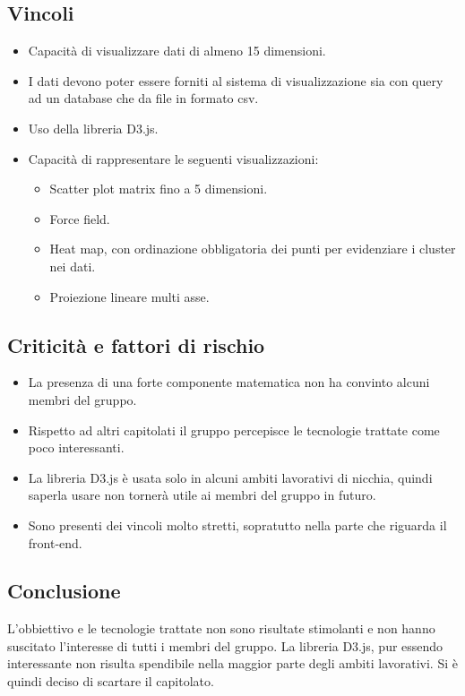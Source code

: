 \subsection{Vincoli}
\begin{itemize}
\item Capacità di visualizzare dati di almeno 15 dimensioni.
\item I dati devono poter essere forniti al sistema di visualizzazione sia con query ad un database che da file in formato csv.
\item Uso della libreria D3.js.
\item Capacità di rappresentare le seguenti visualizzazioni:
\begin{itemize}
	\item Scatter plot matrix fino a 5 dimensioni.
	\item Force field.
	\item Heat map, con ordinazione obbligatoria dei punti per evidenziare i cluster nei dati.
	\item Proiezione lineare multi asse.
\end{itemize}
\end{itemize}

\subsection{Criticità e fattori di rischio}
\begin{itemize}
\item La presenza di una forte componente matematica non ha convinto alcuni membri del gruppo.
\item Rispetto ad altri capitolati il gruppo percepisce le tecnologie trattate come poco interessanti.
\item La libreria D3.js è usata solo in alcuni ambiti lavorativi di nicchia, quindi saperla usare non tornerà utile ai membri del gruppo in futuro.
\item Sono presenti dei vincoli molto stretti, sopratutto nella parte che riguarda il front-end.
\end{itemize}

\subsection{Conclusione}
L'obbiettivo e le tecnologie trattate non sono risultate stimolanti e non hanno suscitato l'interesse di tutti i membri del gruppo. La libreria D3.js, pur essendo interessante non risulta spendibile nella maggior parte degli ambiti lavorativi. Si è quindi deciso di scartare il capitolato.
